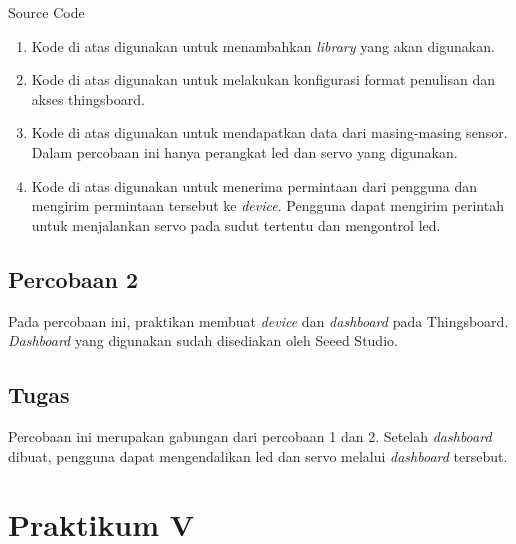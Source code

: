 \documentclass{class}
\begin{document}
  Source Code
    \begin{enumerate}
      \item 
      Kode di atas digunakan untuk menambahkan \emph{library} yang akan digunakan. \\
      \item 
      Kode di atas digunakan untuk melakukan konfigurasi format penulisan dan akses thingsboard. \\
      \item 
      Kode di atas digunakan untuk mendapatkan data dari masing-masing sensor.
      Dalam percobaan ini hanya perangkat led dan servo yang digunakan. \\
      \item 
      Kode di atas digunakan untuk menerima permintaan dari pengguna dan mengirim permintaan tersebut ke \emph{device}.
      Pengguna dapat mengirim perintah untuk menjalankan servo pada sudut tertentu dan mengontrol led. \\
    \end{enumerate}
  \subsection{Percobaan 2}
  Pada percobaan ini, praktikan membuat \emph{device} dan \emph{dashboard} pada Thingsboard.
  \emph{Dashboard} yang digunakan sudah disediakan oleh Seeed Studio.
  \subsection{Tugas}
  Percobaan ini merupakan gabungan dari percobaan 1 dan 2.
  Setelah \emph{dashboard} dibuat, pengguna dapat mengendalikan led dan servo melalui \emph{dashboard} tersebut.

  \section{Praktikum V}
\end{document}
